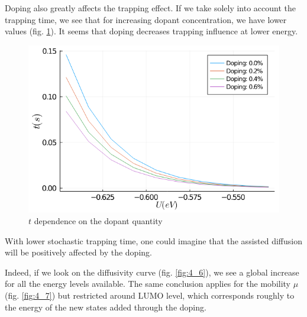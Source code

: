 \vspace{1em}

Doping also greatly affects the trapping effect. If we take solely into account the trapping time, we see that for increasing dopant concentration, we have lower values (fig. \ref{fig:4_4}). It seems that doping decreases trapping influence at lower energy.

\begin{figure}[!h]
    \centering
    \includegraphics*[width=.5\paperwidth]{figures/4_thermal/t_doped.png}
    \caption{$t$ dependence on the dopant quantity\label{fig:4_4}}
\end{figure}

With lower stochastic trapping time, one could imagine that the assisted diffusion will be positively affected by the doping.

Indeed, if we look on the diffusivity curve (fig. \ref{fig:4_6}), we see a global increase for all the energy levels available. The same conclusion applies for the mobility $\mu$ (fig. \ref{fig:4_7}) but restricted around LUMO level, which corresponds roughly to the energy of the new states added through the doping.

